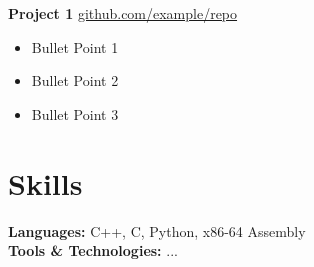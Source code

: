 \documentclass[11pt]{article}
\begin{document}
\textbf{Project 1} \hfill \href{https://github.com/example/repo}{github.com/example/repo} \\
\vspace{-9pt}
\begin{itemize}
  \item Bullet Point 1
  \item Bullet Point 2
  \item Bullet Point 3
\end{itemize}

\vspace{-18.5pt}


\section*{Skills}
\textbf{Languages:} C++, C, Python, x86-64 Assembly \\
\textbf{Tools \& Technologies:} ...

\vspace{-18.5pt}
\end{document}
